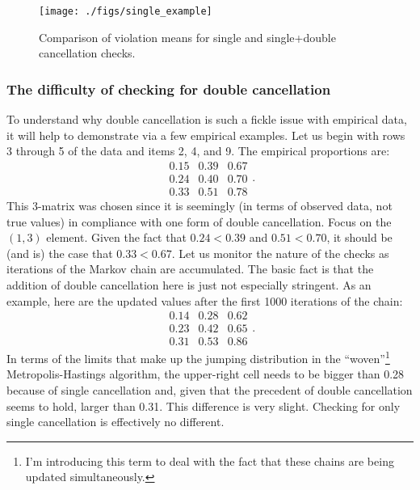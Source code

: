 \documentclass[12pt]{article}
\begin{document}
\begin{figure}
\centering
\caption{Comparison of violation means for single and single+double cancellation checks.} \label{single_example}
\texttt{[image: ./figs/single\_example]}
\end{figure}

\subsubsection{The difficulty of checking for double cancellation}
To understand why double cancellation is such a fickle issue with empirical data, it will help to demonstrate via a few empirical examples. Let us begin with rows 3 through 5 of the  data and items 2, 4, and 9. The empirical proportions are:
\[
\begin{array}{ccc}
0.15& 0.39& 0.67 \\
0.24 &0.40 &0.70 \\
 0.33& 0.51& 0.78 
\end{array}.
\]
This 3-matrix was chosen since it is seemingly (in terms of observed data, not true values) in compliance with one form of double cancellation. Focus on the $(1,3)$ element. Given the fact that $0.24<0.39$ and $0.51<0.70$, it should be (and is) the case that $0.33<0.67$. Let us monitor the nature of the checks as iterations of the Markov chain are accumulated. The basic fact is that the addition of double cancellation here is just not especially stringent. As an example, here are the updated values after the first 1000 iterations of the chain:
\[
\begin{array}{ccc}
0.14 &0.28& 0.62 \\
 0.23& 0.42& 0.65 \\
 0.31& 0.53& 0.86
\end{array}.
\]
In terms of the limits that make up the jumping distribution in the ``woven''\footnote{I'm introducing this term to deal with the fact that these chains are being updated simultaneously.} Metropolis-Hastings algorithm, the upper-right cell needs to be bigger than 0.28 because of single cancellation and, given that the precedent of double cancellation seems to hold, larger than 0.31. This difference is very slight. Checking for only single cancellation is effectively no different.
\end{document}

